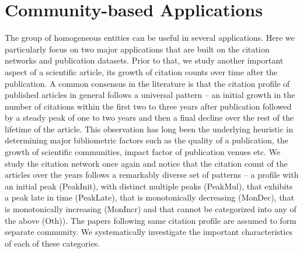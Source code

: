 \section{Community-based Applications}
The group of homogeneous entities can be useful in several applications. Here we particularly focus on two major applications that are
built on the citation networks and publication datasets. Prior to that, we study another important aspect of a scientific article, its
growth of citation counts over time after the publication. A common consensus in the literature is that the citation profile of published
articles in general follows a universal pattern -- an initial growth in the number of citations within the first two to three years after
publication followed by a steady peak of one to two years and then a final decline over the rest of the lifetime of the article. This
observation has long been the underlying heuristic in determining major bibliometric factors such as the quality of a publication, the
growth of scientific communities, impact factor of publication venues etc. We study the citation network once again and notice that the
citation count of the articles over the years follows a remarkably diverse set of patterns -- a profile with an initial peak (PeakInit),
with distinct multiple peaks (PeakMul), that exhibits a peak late in time (PeakLate), that is monotonically decreasing (MonDec), that is
monotonically increasing (MonIncr) and that cannot be categorized into any of the above (Oth)). The papers following same citation profile
are assumed to form separate community. We systematically investigate the important
characteristics of each of these categories. 

